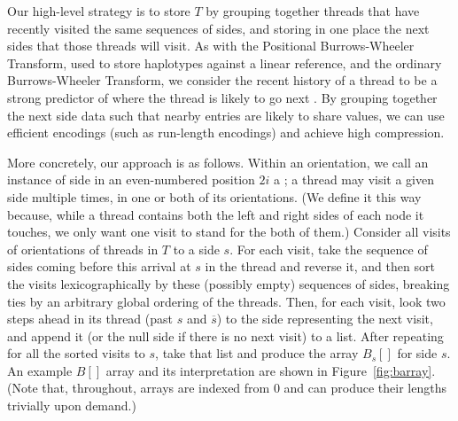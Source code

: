 Our high-level strategy is to store $T$ by grouping together threads that have recently visited the same sequences of sides, and storing in one place the next sides that those threads will visit. As with the Positional Burrows-Wheeler Transform, used to store haplotypes against a linear reference, and the ordinary Burrows-Wheeler Transform, we consider the recent history of a thread to be a strong predictor of where the thread is likely to go next \cite{durbin2014efficient}. By grouping together the next side data such that nearby entries are likely to share values, we can use efficient encodings (such as run-length encodings) and achieve high compression.

More concretely, our approach is as follows. Within an orientation, we call an instance of side in an even-numbered position ${2i}$ a ; a thread may visit a given side multiple times, in one or both of its orientations. (We define it this way because, while a thread contains both the left and right sides of each node it touches, we only want one visit to stand for the both of them.) Consider all visits of orientations of threads in $T$ to a side $s$. For each visit, take the sequence of sides coming before this arrival at $s$ in the thread and reverse it, and then sort the visits lexicographically by these (possibly empty) sequences of sides, breaking ties by an arbitrary global ordering of the threads. Then, for each visit, look two steps ahead in its thread (past $s$ and $\overline{s}$) to the side representing the next visit, and append it (or the null side if there is no next visit) to a list. After repeating for all the sorted visits to $s$, take that list and produce the array $B_s[]$ for side $s$. An example $B[]$ array and its interpretation are shown in Figure~\ref{fig:barray}. (Note that, throughout, arrays are indexed from $0$ and can produce their lengths trivially upon demand.)  

